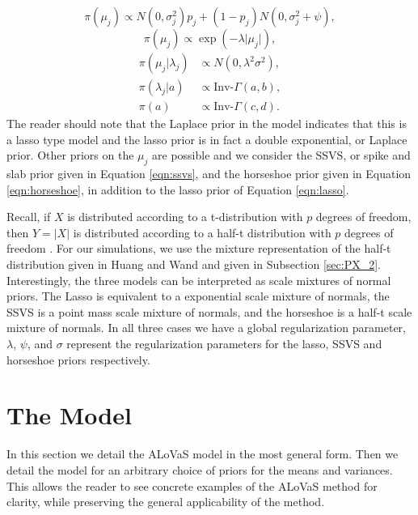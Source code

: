 \begin{equation}\label{eqn:ssvs}
\pi(\mu_j) \propto N(0,\sigma_j^2)p_j+(1-p_j)N(0,\sigma_j^2+\psi),
\end{equation}
\begin{equation}\label{eqn:lasso}
\pi(\mu_j) \propto \exp(-\lambda\vert \mu_j\vert),
\end{equation}
\begin{align}\label{eqn:horseshoe}
\pi(\mu_j\vert \lambda_j) &\propto N(0, \lambda^2\sigma^2),\\
\pi(\lambda_j | a)&\propto \text{Inv-}\Gamma(a,b),\nonumber \\ \nonumber
\pi(a)&\propto \text{Inv-}\Gamma(c,d).
\end{align}
The reader should note that the Laplace prior in the model indicates that this is a lasso type model and the lasso prior is in fact a double exponential, or Laplace prior. Other priors on the $\mu_j$ are possible and we consider the SSVS, or spike and slab prior given in Equation \ref{eqn:ssvs}, and the horseshoe prior given in Equation \ref{eqn:horseshoe}, in addition to the lasso prior of Equation \ref{eqn:lasso}. 

Recall, if $X$ is distributed according to a t-distribution with $p$ degrees of freedom, then $Y=\vert X\vert$ is distributed according to a half-t distribution with $p$ degrees of freedom \cite{johnson1995continuous}. For our simulations, we use the mixture representation of the half-t distribution given in Huang and Wand \cite{huang2013simple} and given in Subsection \ref{sec:PX_2}. Interestingly, the three models can be interpreted as scale mixtures of normal priors. The Lasso is equivalent to a exponential scale mixture of normals, the SSVS is a point mass scale mixture of normals, and the horseshoe is a half-t scale mixture of normals. In all three cases we have a global regularization parameter, $\lambda$, $\psi$, and $\sigma$ represent the regularization parameters for the lasso, SSVS and horseshoe priors respectively.    


\section{The Model}\label{sec:ALoVaS_model}

In this section we detail the ALoVaS model in the most general form. Then we detail the model for an arbitrary choice of priors for the means and variances. This allows the reader to see concrete examples of the ALoVaS method for clarity, while preserving the general applicability of the method. 

